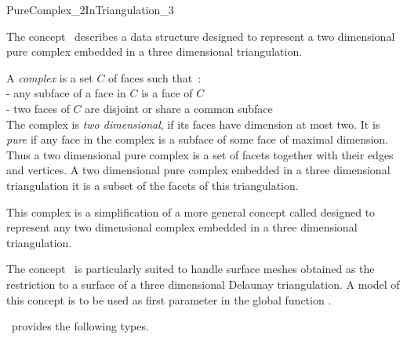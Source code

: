 

\begin{ccRefConcept}{PureComplex_2InTriangulation_3}


\ccDefinition
  
The concept \ccRefName\ describes a data structure
designed  to represent a  two dimensional pure complex 
embedded in a three dimensional triangulation.

A {\em complex} is a set $C$ of faces such that~:\\
- any subface of a face in $C$ is a face of $C$ \\
- two faces of $C$ are disjoint or share a common subface \\
The complex is {\em two dimensional}, if its faces have dimension at most
two. It is {\em pure} if any face in the complex is a subface
of some face of maximal dimension.
Thus a two dimensional pure complex is a set of facets
together with their edges and vertices.
A  two dimensional pure complex  embedded 
in a three dimensional triangulation
it is a subset of the  facets 
of this triangulation.

This complex is a simplification of a more general concept called
 designed to represent any
two dimensional complex 
embedded in a three dimensional triangulation.

The concept \ccRefName\  is particularly suited to handle
surface meshes obtained as the restriction to a surface of 
a  three dimensional Delaunay triangulation.
A model of this concept is to  be used as first parameter in the global
function .


 



\ccTypes
\ccRefName\ provides the following types.


\end{ccRefConcept}
